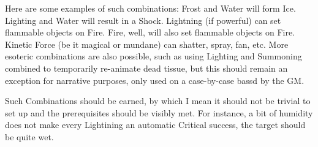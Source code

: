 Here are some examples of such combinations: Frost and Water will form Ice. Lighting and Water will result in a Shock. Lightning (if powerful) can set flammable objects on Fire. Fire, well, will also set flammable objects on Fire. Kinetic Force (be it magical or mundane) can shatter, spray, fan, etc. More esoteric combinations are also possible, such as using Lighting and Summoning combined to temporarily re-animate dead tissue, but this should remain an exception for narrative purposes, only used on a case-by-case bassd by the GM.

Such Combinations should be earned, by which I mean it should not be trivial to set up and the prerequisites should be visibly met. For instance, a bit of humidity does not make every Lightining an automatic Critical success, the target should be quite wet.

